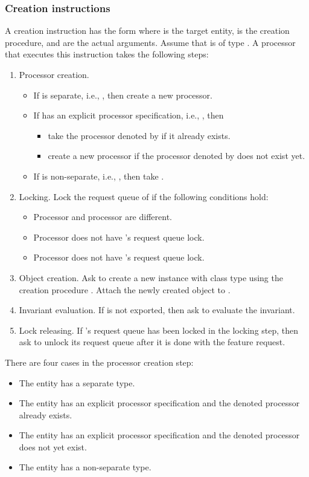 \subsubsection{Creation instructions}
A creation instruction has the form  where  is the target entity,  is the creation procedure, and  are the actual arguments. Assume that  is of type . A processor  that executes this instruction takes the following steps:
\begin{enumerate}
	\item Processor  creation.
		\begin{itemize}
			\item If  is separate, i.e., , then create a new processor.
			\item If  has an explicit processor specification, i.e., , then
				\begin{itemize}
					\item take the processor denoted by  if it already exists.
					\item create a new processor if the processor denoted by  does not exist yet.
				\end{itemize}
			\item If  is non-separate, i.e., , then take .
		\end{itemize}
	\item Locking. Lock the request queue of  if the following conditions hold:
		\begin{itemize}
			\item Processor  and processor  are different.
			\item Processor  does not have 's request queue lock.
			\item Processor  does not have 's request queue lock.
		\end{itemize}
	\item Object creation. Ask  to create a new instance with class type  using the creation procedure . Attach the newly created object to .
	\item Invariant evaluation. If  is not exported, then ask  to evaluate the invariant.
	\item Lock releasing. If 's request queue has been locked in the locking step, then ask  to unlock its request queue after it is done with the feature request.
\end{enumerate}
There are four cases in the processor creation step:
\begin{itemize}
	\item The entity  has a separate type.
	\item The entity  has an explicit processor specification and the denoted processor already exists.
	\item The entity  has an explicit processor specification and the denoted processor does not yet exist.
	\item The entity  has a non-separate type.
\end{itemize}
